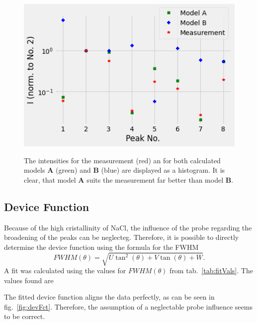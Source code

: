 \begin{figure}[ht]
    \centering
    \includegraphics[width = 0.8\linewidth]{Bilder/Auswertung/NaCl/IntsModels.png}
    \label{fig:histoInts}
    \caption{The intensities for the measurement (red) an for both calculated models \textbf{A} (green) and \textbf{B} (blue) are displayed as a histogram. It is clear, that model \textbf{A} suits the measurement far better than model \textbf{B}.}
\end{figure}

\subsection*{Device Function}

Because of the high cristallinity of NaCl, the influence of the probe regarding the broadening of the peaks can be neglecteg. Therefore, it is possible to directly determine the device function using the formula for the FWHM 
\begin{equation}
    FWHM(\theta) = \sqrt{U \tan^2(\theta) + V \tan(\theta) + W}.
\end{equation}
A fit was calculated using the values for $FWHM(\theta)$ from tab.~\ref{tab:fitVals}. The values found are \par 
\centerline{} \par
The fitted device function aligns the data perfectly, as can be seen in fig.~\ref{fig:devFct}. Therefore, the assumption of a neglectable probe influence seems to be correct.

